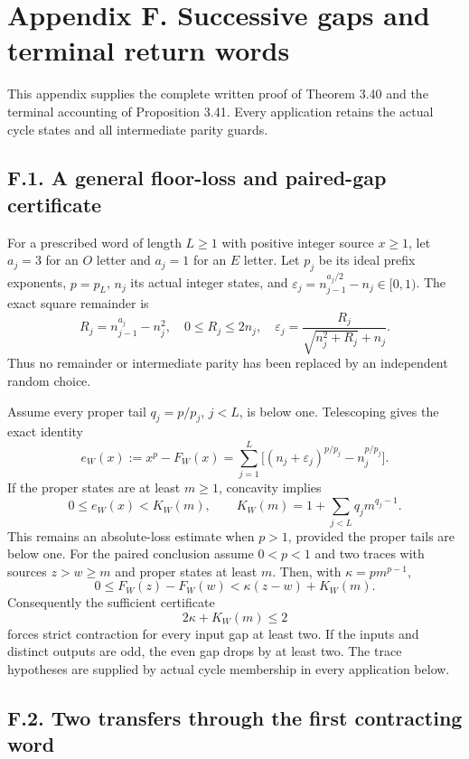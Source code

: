 \documentclass[12pt]{article}
\begin{document}
\section{Appendix F. Successive gaps and terminal return
words}\label{appendix-f.-successive-gaps-and-terminal-return-words}

This appendix supplies the complete written proof of Theorem 3.40 and
the terminal accounting of Proposition 3.41. Every application retains
the actual cycle states and all intermediate parity guards.

\subsection{F.1. A general floor-loss and paired-gap
certificate}\label{f.1.-a-general-floor-loss-and-paired-gap-certificate}

For a prescribed word of length \(L\ge1\) with positive integer source
\(x\ge1\), let \(a_j=3\) for an \(O\) letter and \(a_j=1\) for an \(E\)
letter. Let \(p_j\) be its ideal prefix exponents, \(p=p_L\), \(n_j\)
its actual integer states, and
\(\varepsilon_j=n_{j-1}^{a_j/2}-n_j\in[0,1)\). The exact square
remainder is \[
R_j=n_{j-1}^{a_j}-n_j^2,\quad 0\le R_j\le2n_j,\quad
\varepsilon_j=\frac{R_j}{\sqrt{n_j^2+R_j}+n_j}.
\] Thus no remainder or intermediate parity has been replaced by an
independent random choice.

Assume every proper tail \(q_j=p/p_j\), \(j<L\), is below one.
Telescoping gives the exact identity \[
e_W(x):=x^p-F_W(x)=
\sum_{j=1}^L\bigl[(n_j+\varepsilon_j)^{p/p_j}-n_j^{p/p_j}\bigr].
\] If the proper states are at least \(m\ge1\), concavity implies \[
0\le e_W(x)<K_W(m),\qquad
K_W(m)=1+\sum_{j<L}q_jm^{q_j-1}.
\tag{F1}
\] This remains an absolute-loss estimate when \(p>1\), provided the
proper tails are below one. For the paired conclusion assume \(0<p<1\)
and two traces with sources \(z>w\ge m\) and proper states at least
\(m\). Then, with \(\kappa=p m^{p-1}\), \[
0\le F_W(z)-F_W(w)<\kappa(z-w)+K_W(m).
\tag{F2}
\] Consequently the sufficient certificate \[
2\kappa+K_W(m)\le2
\tag{F3}
\] forces strict contraction for every input gap at least two. If the
inputs and distinct outputs are odd, the even gap drops by at least two.
The trace hypotheses are supplied by actual cycle membership in every
application below.

\subsection{F.2. Two transfers through the first contracting
word}\label{f.2.-two-transfers-through-the-first-contracting-word}
\end{document}
